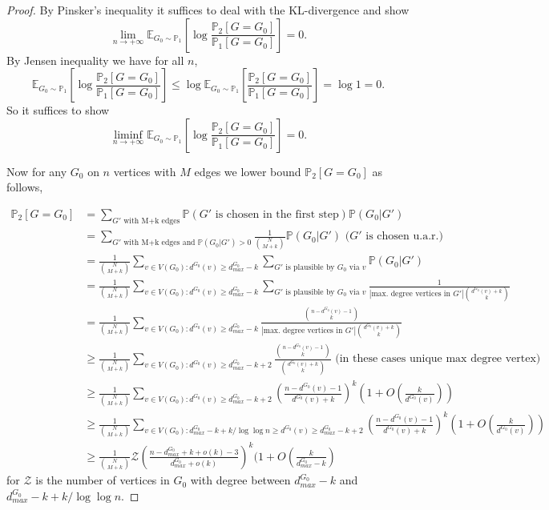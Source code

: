 \documentclass[12pt,a4paper]{article}
\numberwithin{equation}{section}
\numberwithin{equation}{section}
\newcommand{\1}{{\text{\Large $\mathfrak 1$}}}
\newcommand{\2}[1]{{\text{\Large $\mathfrak 1$}\!\left(#1\right)}}
\begin{document}
\begin{proof}
By Pinsker's inequality it suffices to deal with the KL-divergence and show $$ \lim_{n \rightarrow + \infty} \mathbb{E}_{G_0 \sim \mathbb{P}_1} \left[ \log \frac{\mathbb{P}_2[G=G_0]}{\mathbb{P}_1[G=G_0]}  \right]=0.$$ By Jensen inequality we have for all $n$, $$ \mathbb{E}_{G_0 \sim \mathbb{P}_1} \left[ \log \frac{\mathbb{P}_2[G=G_0]}{\mathbb{P}_1[G=G_0]}  \right] \leq  \log  \mathbb{E}_{G_0 \sim \mathbb{P}_1}  \left[\frac{\mathbb{P}_2[G=G_0]}{\mathbb{P}_1[G=G_0]}  \right]=\log 1=0.$$ So it suffices to show $$ \liminf_{n \rightarrow + \infty} \mathbb{E}_{G_0 \sim \mathbb{P}_1} \left[ \log \frac{\mathbb{P}_2[G=G_0]}{\mathbb{P}_1[G=G_0]}  \right]=0.$$

Now for any $G_0$ on $n$ vertices with $M$ edges we lower bound $\mathbb{P}_2[G=G_0]$ as follows,

\begin{align*}
\mathbb{P}_2[G=G_0]&=\sum_{G' \text{ with M+k edges}} \mathbb{P}(G' \text{ is chosen in the first step}) \mathbb{P}(G_0|G')\\
&=\sum_{G' \text{ with M+k edges and }\mathbb{P}(G_0|G')>0 } \frac{1}{\binom{N}{M+k}} \mathbb{P}(G_0|G') \text{ ($G'$ is chosen u.a.r.)}\\
&= \frac{1}{\binom{N}{M+k}} \sum_{v \in V(G_0)  : d^{G_0}(v)  \geq d^{G_0}_{max}-k} \sum_{G' \text{ is plausible by } G_0 \text{ via } v}\mathbb{P}(G_0|G')   \\
&=  \frac{1}{\binom{N}{M+k}} \sum_{v \in V(G_0) : d^{G_0}(v)  \geq d^{G_0}_{max}-k} \sum_{G' \text{ is plausible by } G_0 \text{ via } v}\frac{1}{|\text{max. degree vertices in } G'|\binom{d^{G_0}(v)+k}{k}}\\
&=  \frac{1}{\binom{N}{M+k}} \sum_{v \in V(G_0) : d^{G_0}(v)  \geq d^{G_0}_{max}-k} \frac{\binom{n-d^{G_0}(v)-1}{k}}{|\text{max. degree vertices in } G'|\binom{d^{G_0}(v)+k}{k}}\\
&\geq   \frac{1}{\binom{N}{M+k}} \sum_{v \in V(G_0) : d^{G_0}(v)  \geq d^{G_0}_{max}-k+2} \frac{\binom{n-d^{G_0}(v)-1}{k}}{\binom{d^{G_0}(v)+k}{k}} \text{ (in these cases unique max degree vertex)}\\
&\geq   \frac{1}{\binom{N}{M+k}} \sum_{v \in V(G_0) : d^{G_0}(v)  \geq d^{G_0}_{max}-k+2} \left(\frac{n-d^{G_0}(v)-1}{d^{G_0}(v)+k}\right)^{k}(1+O(\frac{k}{d^{G_0}(v)}))\\
&\geq   \frac{1}{\binom{N}{M+k}} \sum_{v \in V(G_0) : d^{G_0}_{max}-k+k/\log \log n \geq d^{G_0}(v)  \geq d^{G_0}_{max}-k+2} \left(\frac{n-d^{G_0}(v)-1}{d^{G_0}(v)+k}\right)^{k}(1+O(\frac{k}{d^{G_0}(v)}))\\
&\geq   \frac{1}{\binom{N}{M+k}} \mathcal{Z}\left(\frac{n-d^{G_0}_{max}+k+o(k)-3}{d^{G_0}_{max}+o(k)}\right)^{k}(1+O(\frac{k}{d^{G_0}_{max}-k})
\end{align*} for $\mathcal{Z}$ is the number of vertices in $G_0$ with degree between $d^{G_0}_{max}-k$ and $d^{G_0}_{max}-k+k/\log \log n$. 


\end{proof}
\end{document}
